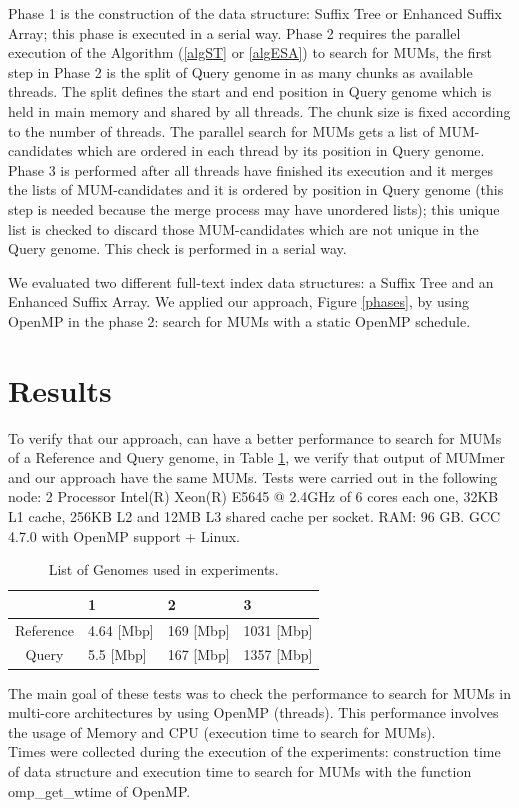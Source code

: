 \documentclass[runningheads,a5paper]{llncs}
\begin{document}
Phase 1 is the construction of the data structure: Suffix Tree or Enhanced Suffix Array; this phase is executed in a serial way. Phase 2 requires the parallel execution of the Algorithm (\ref{algST} or \ref{algESA}) to search for MUMs, the first step in Phase 2 is the split of Query genome in as many chunks as available threads. The split defines the start and end position in Query genome which is held in main memory and shared by all threads. The chunk size is fixed according to the number of threads. The parallel search for MUMs gets a list of MUM-candidates which are ordered in each thread by its position in Query genome. Phase 3 is performed after all threads have finished its execution and it merges the lists of MUM-candidates and it is ordered by position in Query genome (this step is needed because the merge process may have unordered lists); this unique list is checked to discard those MUM-candidates which are not unique in the Query genome. This check is performed in a serial way.

We evaluated two different full-text index data structures: a Suffix Tree and an Enhanced Suffix Array. We applied our approach, Figure \ref{phases}, by using OpenMP in the phase 2: search for MUMs with a static OpenMP schedule.
\section{Results}
To verify that our approach, can have a better performance to search for MUMs of a Reference and Query genome, in Table \ref{genomes}, we verify that output of MUMmer and our approach have the same MUMs. Tests were carried out in the following node: 2 Processor Intel(R) Xeon(R) E5645 @ 2.4GHz of 6 cores each one, 32KB L1 cache, 256KB L2 and 12MB L3 shared cache per socket. RAM: 96 GB. GCC 4.7.0 with OpenMP support + Linux. 
\begin{table} 
\centering
\caption{List of Genomes used in experiments.}
\label{genomes}
\begin{tabular}{|c|l|l|l|} \hline
  & 1 & 2 & 3 \\ \hline
  Reference & 4.64 [Mbp] & 169 [Mbp] & 1031 [Mbp] \\ \hline
  Query & 5.5 [Mbp] & 167 [Mbp] & 1357 [Mbp] \\ 
  \hline
\end{tabular}
\end{table}
The main goal of these tests was to check the performance to search for MUMs in multi-core architectures by using OpenMP (threads). This performance involves the usage of Memory and CPU (execution time to search for MUMs).\\
Times were collected during the execution of the experiments: construction time of data structure and execution time to search for MUMs with the function omp\_get\_wtime of OpenMP.\\
\end{document}
